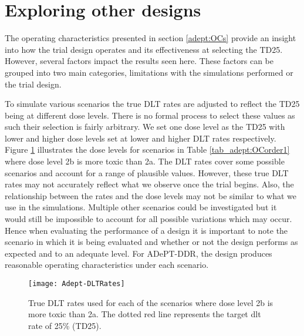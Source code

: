 
\section{Exploring other designs}  
\label{adept:Exploring-other-designs}

The operating characteristics presented in section \ref{adept:OCs} provide an insight into how the trial design operates and its effectiveness at selecting the TD25. However, several factors impact the results seen here. These factors can be grouped into two main categories, limitations with the simulations performed or the trial design.

To simulate various scenarios the true DLT rates are adjusted to reflect the TD25 being at different dose levels. There is no formal process to select these values as such their selection is fairly arbitrary. We set one dose level as the TD25 with lower and higher dose levels set at lower and higher DLT rates respectively. Figure \ref{fig_adept:dlt_rates} illustrates the dose levels for scenarios in Table \ref{tab_adept:OCorder1} where dose level 2b is more toxic than 2a. The DLT rates cover some possible scenarios and account for a range of plausible values. However, these true DLT rates may not accurately reflect what we observe once the trial begins. Also, the relationship between the rates and the dose levels may not be similar to what we use in the simulations. Multiple other scenarios could be investigated but it would still be impossible to account for all possible variations which may occur. Hence when evaluating the performance of a design it is important to note the scenario in which it is being evaluated and whether or not the design performs as expected and to an adequate level. For ADePT-DDR, the design produces reasonable operating characteristics under each scenario. 

\begin{figure}[h!]
	\centering
	\caption[Illustration of true DLT rates used in simulations.]{True DLT rates used for each of the scenarios where dose level 2b is more toxic than 2a. The dotted red line represents the target dlt rate of 25\% (TD25).}
	\label{fig_adept:dlt_rates}
	\texttt{[image: Adept-DLTRates]}
\end{figure}
 
